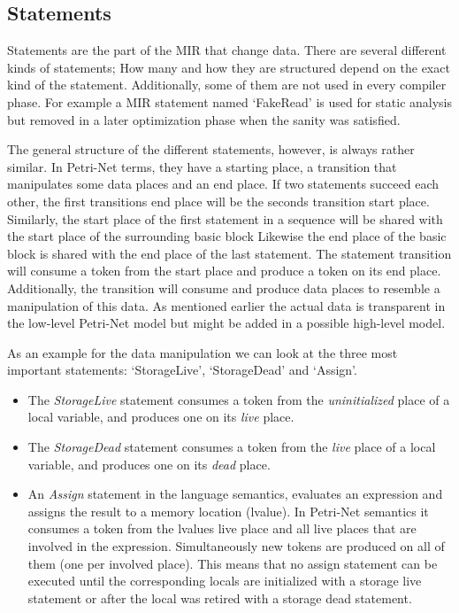 \subsection{Statements}
Statements are the part of the MIR that change data.
There are several different kinds of statements;
How many and how they are structured depend on the exact kind of the statement.
Additionally, some of them are not used in every compiler phase.
For example a MIR statement named `FakeRead' is used for static analysis but removed in a later optimization phase when the sanity was satisfied.

The general structure of the different statements, however, is always rather similar.
In Petri-Net terms, they have a starting place, a transition that manipulates some data places and an end place.
If two statements succeed each other, the first transitions end place will be the seconds transition start place.
Similarly, the start place of the first statement in a sequence will be shared with the start place of the surrounding basic block
Likewise the end place of the basic block is shared with the end place of the last statement.
The statement transition will consume a token from the start place and produce a token on its end place.
Additionally, the transition will consume and produce data places to resemble a manipulation of this data.
As mentioned earlier the actual data is transparent in the low-level Petri-Net model but might be added in a possible high-level model.

As an example for the data manipulation we can look at the three most important statements: `StorageLive', `StorageDead' and `Assign'.
\begin{itemize}
    \item The \textit{StorageLive} statement consumes a token from the \textit{uninitialized} place of a local variable, and produces one on its \textit{live} place.
    \item The \textit{StorageDead} statement consumes a token from the \textit{live} place of a local variable, and produces one on its \textit{dead} place.
    \item An \textit{Assign} statement in the language semantics, evaluates an expression and assigns the result to a memory location (lvalue).
    In Petri-Net semantics it consumes a token from the lvalues live place and all live places that are involved in the expression.
    Simultaneously new tokens are produced on all of them (one per involved place).
    This means that no assign statement can be executed until the corresponding locals are initialized with a storage live statement or after the local was retired with a storage dead statement.
\end{itemize}

